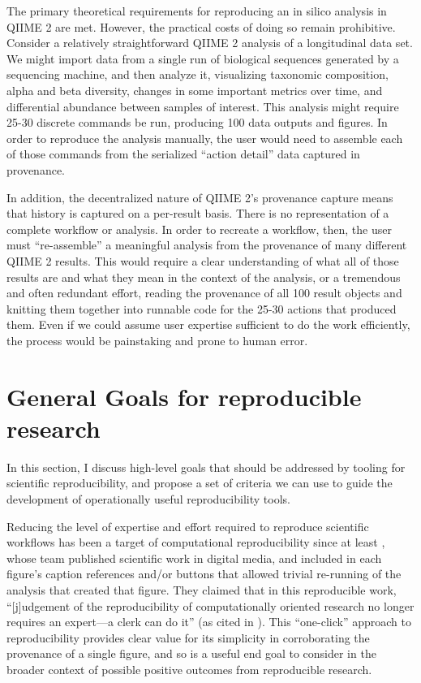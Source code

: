 The primary theoretical requirements for reproducing an in silico analysis in
QIIME 2 are met. However, the practical costs of doing so remain prohibitive.
Consider a relatively straightforward QIIME 2 analysis of a longitudinal data
set. We might import data from a single run of biological sequences generated by
a sequencing machine, and then analyze it, visualizing taxonomic composition,
alpha and beta diversity, changes in some important metrics over time, and
differential abundance between samples of interest. This analysis might require
25-30 discrete commands be run, producing 100 data outputs and figures. In order
to reproduce the analysis manually, the user would need to assemble each of
those commands from the serialized “action detail” data captured in provenance. 

In addition, the decentralized nature of QIIME 2’s provenance capture means that
history is captured on a per-result basis. There is no representation of a
complete workflow or analysis. In order to recreate a workflow, then, the user
must “re-assemble” a meaningful analysis from the provenance of many different
QIIME 2 results. This would require a clear understanding of what all of those
results are and what they mean in the context of the analysis, or a tremendous
and often redundant effort, reading the provenance of all 100 result objects and
knitting them together into runnable code for the 25-30 actions that produced
them. Even if we could assume user expertise sufficient to do the work
efficiently, the process would be painstaking and prone to human error. 


\section{General Goals for reproducible research}
\label{section:repro_goals}

In this section, I discuss high-level goals that should be addressed by tooling
for scientific reproducibility, and propose a set of criteria we can use to
guide the development of operationally useful reproducibility tools.

Reducing the level of expertise and effort required to reproduce scientific
workflows has been a target of computational reproducibility since at least \textcite{claerbout_electronic_1992},
whose team published scientific work in digital media, and included in each figure’s
caption references and/or buttons that allowed trivial re-running of the
analysis that created that figure. They claimed that in this reproducible work,
“[j]udgement of the reproducibility of computationally oriented research no
longer requires an expert—a clerk can do it” (as cited in \cite[76]{plesser_reproducibility_2018}).
This “one-click” approach to reproducibility provides clear value for its
simplicity in corroborating the provenance of a single figure, and so is a
useful end goal to consider in the broader context of possible positive outcomes
from reproducible research.

